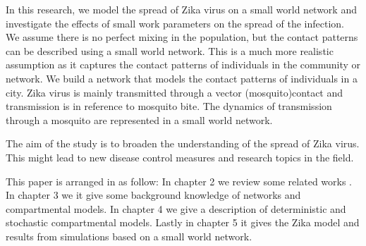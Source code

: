 In this research, we model the spread of Zika virus on a small world network and investigate the effects of small work parameters on the spread of the infection. We assume there is no perfect mixing in the population, but the contact patterns can be described using a small world network. This is a much more realistic assumption as it captures the contact patterns of individuals
in the community or network.  We build a network that models the contact patterns of individuals in a city.
Zika virus is mainly transmitted through a vector (mosquito)contact and transmission is in reference to mosquito bite. The dynamics of transmission through a mosquito are represented in a small world network.

The aim of the study is to broaden the understanding of the spread of Zika virus. This might lead to new disease control measures and research topics in the field.

This paper is arranged in as follow: In chapter 2 we review some related works . In chapter 3 we  it give some background knowledge of networks and compartmental models. In chapter 4 we  give a description of deterministic and stochastic compartmental models. Lastly in chapter 5 it gives the Zika model and results from simulations based on a small world network.

